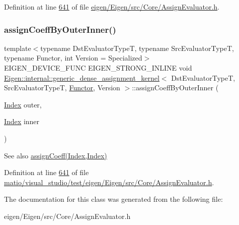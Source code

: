 Definition at line \hyperlink{eigen_2_eigen_2src_2_core_2_assign_evaluator_8h_source_l00641}{641} of file \hyperlink{eigen_2_eigen_2src_2_core_2_assign_evaluator_8h_source}{eigen/\+Eigen/src/\+Core/\+Assign\+Evaluator.\+h}.

\mbox{\label{class_eigen_1_1internal_1_1generic__dense__assignment__kernel_aff1bc113e270d4f895ca90570536303b}} 
\subsubsection{\texorpdfstring{assign\+Coeff\+By\+Outer\+Inner()}{assignCoeffByOuterInner()}\hspace{0.1cm}{\footnotesize\ttfamily [2/2]}}
{\footnotesize\ttfamily template$<$typename Dst\+Evaluator\+TypeT, typename Src\+Evaluator\+TypeT, typename Functor, int Version = Specialized$>$ \\
E\+I\+G\+E\+N\+\_\+\+D\+E\+V\+I\+C\+E\+\_\+\+F\+U\+NC E\+I\+G\+E\+N\+\_\+\+S\+T\+R\+O\+N\+G\+\_\+\+I\+N\+L\+I\+NE void \hyperlink{class_eigen_1_1internal_1_1generic__dense__assignment__kernel}{Eigen\+::internal\+::generic\+\_\+dense\+\_\+assignment\+\_\+kernel}$<$ Dst\+Evaluator\+TypeT, Src\+Evaluator\+TypeT, \hyperlink{struct_functor}{Functor}, Version $>$\+::assign\+Coeff\+By\+Outer\+Inner (\begin{DoxyParamCaption}\item[{\hyperlink{namespace_eigen_a62e77e0933482dafde8fe197d9a2cfde}{Index}}]{outer,  }\item[{\hyperlink{namespace_eigen_a62e77e0933482dafde8fe197d9a2cfde}{Index}}]{inner }\end{DoxyParamCaption})\hspace{0.3cm}{\ttfamily [inline]}}

\begin{DoxySeeAlso}{See also}
\hyperlink{class_eigen_1_1internal_1_1generic__dense__assignment__kernel_a7ca974cc4049f1ef3d6f2feac94ea35b}{assign\+Coeff(\+Index,\+Index)} 
\end{DoxySeeAlso}


Definition at line \hyperlink{matio_2visual__studio_2test_2eigen_2_eigen_2src_2_core_2_assign_evaluator_8h_source_l00641}{641} of file \hyperlink{matio_2visual__studio_2test_2eigen_2_eigen_2src_2_core_2_assign_evaluator_8h_source}{matio/visual\+\_\+studio/test/eigen/\+Eigen/src/\+Core/\+Assign\+Evaluator.\+h}.



The documentation for this class was generated from the following file\+:\begin{DoxyCompactItemize}
\item 
eigen/\+Eigen/src/\+Core/\+Assign\+Evaluator.\+h\end{DoxyCompactItemize}
